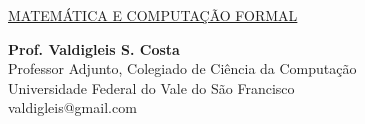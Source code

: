 \begingroup
  \thispagestyle{empty}
  \vspace*{1.0cm}
  \begin{flushleft}
    {\LARGE\underline{MATEMÁTICA E COMPUTAÇÃO FORMAL}}
  \end{flushleft}
  \begin{flushleft}
    {\Large \textbf{Prof. Valdigleis S. Costa}}\\
    Professor Adjunto, Colegiado de Ciência da Computação\\
    Universidade Federal do Vale do São Francisco\\
    valdigleis@gmail.com
  \end{flushleft}
\endgroup
